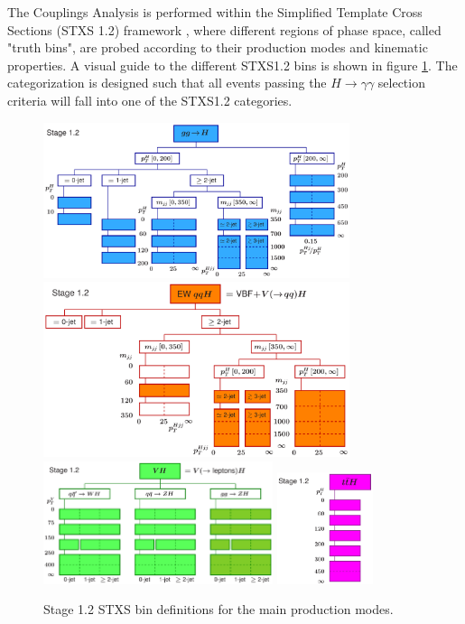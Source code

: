 The Couplings Analysis is performed within the Simplified Template Cross Sections (STXS 1.2) framework \cite{YellowReport4}, where different regions of phase space, called "truth bins", are probed according to their production modes and kinematic properties. A visual guide to the different STXS1.2 bins is shown in figure \ref{fig:STXS_scheme}. The categorization is designed such that all events passing the $H \rightarrow \gamma \gamma$ selection criteria will fall into one of the STXS1.2 categories.

\begin{figure}[tbp]
  \centering
  \includegraphics[width=0.8\textwidth]{figures/theory_chapter/simplifiedXS_ggF_1_2} \\[3mm]
  \includegraphics[width=0.8\textwidth]{figures/theory_chapter/simplifiedXS_VBF_1_2} \\[3mm]
  \includegraphics[width=0.6\textwidth]{figures/theory_chapter/simplifiedXS_VH_1_2}
  \includegraphics[width=0.25\textwidth]{figures/theory_chapter/simplifiedXS_ttH_1_2}
  \caption{Stage 1.2 STXS bin definitions for the main production modes.}
  \label{fig:STXS_scheme}
\end{figure}


